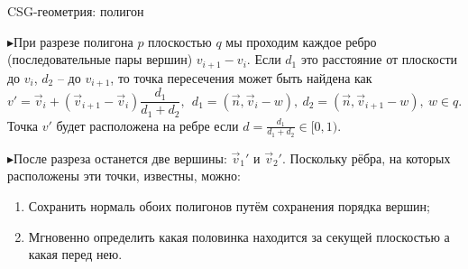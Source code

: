 \documentclass{beamer}
\newcommand{\tri}{{\color{blue!40} $\blacktriangleright$}\:}
\begin{document}
\begin{frame}{CSG-геометрия: полигон}
\footnotesize

\tri При разрезе полигона $p$ плоскостью $q$ мы проходим каждое ребро (последовательные пары вершин) $v_{i + 1} - v_i$. Если $d_1$ это расстояние от плоскости до $v_i$, $d_2$ -- до $v_{i+1}$, то точка пересечения может быть найдена как
\begin{equation}\nonumber
    v' = \vec v_i + (\vec v_{i+1} - \vec v_i) \frac{d_1}{d_1 + d_2}, ~~ d_1 = (\vec n, \vec v_i - w), ~ d_2 = (\vec n, \vec v_{i+1} - w), ~ w \in q.
\end{equation}
Точка $v'$ будет расположена на ребре если $d = \frac{d_1}{d_1 + d_2} \in [0,1)$.

\begin{center}
\begin{minipage}{0.65\textwidth}
    \tri После разреза останется две вершины: $\vec v_1'$ и $\vec v_2'$. Поскольку рёбра, на которых расположены эти точки, известны, можно:
    \begin{enumerate}
        \item Сохранить нормаль обоих полигонов путём сохранения порядка вершин;
        \item Мгновенно определить какая половинка находится за секущей плоскостью а какая перед нею.
    \end{enumerate}

\end{minipage}\hfill
\begin{minipage}{0.3\textwidth}
    \begin{center}
    \end{center}
\end{minipage}
\end{center}

\end{frame}
\end{document}
